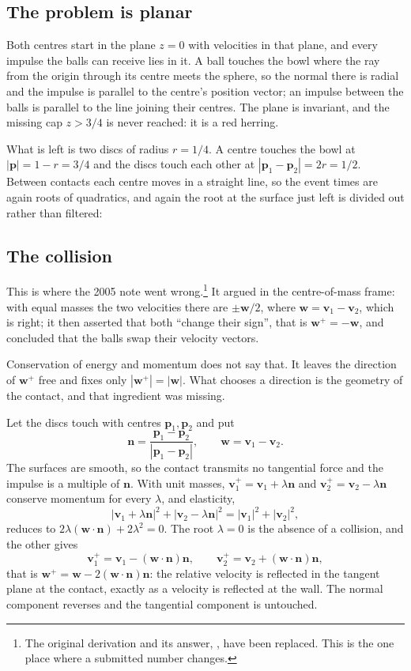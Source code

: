 \documentclass[11pt]{article}
\newcommand{\bp}{\mathbf{p}}
\newcommand{\bv}{\mathbf{v}}
\newcommand{\bw}{\mathbf{w}}
\newcommand{\bn}{\mathbf{n}}
\begin{document}
\subsection{The problem is planar}
Both centres start in the plane $z=0$ with velocities in that plane, and
every impulse the balls can receive lies in it. A ball touches the bowl
where the ray from the origin through its centre meets the sphere, so the
normal there is radial and the impulse is parallel to the centre's position
vector; an impulse between the balls is parallel to the line joining their
centres. The plane is invariant, and the missing cap $z > 3/4$ is never
reached: it is a red herring.

What is left is two discs of radius $r=1/4$. A centre touches the bowl at
$|\bp| = 1-r = 3/4$ and the discs touch each other at
$|\bp_1 - \bp_2| = 2r = 1/2$. Between contacts each centre moves in a
straight line, so the event times are again roots of quadratics, and again
the root at the surface just left is divided out rather than filtered:



\subsection{The collision}
This is where the 2005 note went wrong.\footnote{The original derivation and
its answer, \bowlold, have been replaced. This is the one place where a
submitted number changes.} It argued in the centre-of-mass frame: with equal
masses the two velocities there are $\pm\bw/2$, where $\bw = \bv_1-\bv_2$,
which is right; it then asserted that both ``change their sign'', that is
$\bw^+ = -\bw$, and concluded that the balls swap their velocity vectors.

Conservation of energy and momentum does not say that. It leaves the
direction of $\bw^+$ free and fixes only $|\bw^+| = |\bw|$. What chooses a
direction is the geometry of the contact, and that ingredient was missing.

Let the discs touch with centres $\bp_1,\bp_2$ and put
\[
   \bn = \frac{\bp_1-\bp_2}{|\bp_1-\bp_2|}, \qquad \bw = \bv_1-\bv_2 .
\]
The surfaces are smooth, so the contact transmits no tangential force and
the impulse is a multiple of $\bn$. With unit masses,
$\bv_1^+ = \bv_1 + \lambda\bn$ and $\bv_2^+ = \bv_2 - \lambda\bn$ conserve
momentum for every $\lambda$, and elasticity,
\[
   |\bv_1 + \lambda\bn|^2 + |\bv_2 - \lambda\bn|^2 = |\bv_1|^2 + |\bv_2|^2 ,
\]
reduces to $2\lambda(\bw\cdot\bn) + 2\lambda^2 = 0$. The root $\lambda = 0$
is the absence of a collision, and the other gives
\begin{equation}\label{eq:collide}
   \bv_1^+ = \bv_1 - (\bw\cdot\bn)\bn , \qquad
   \bv_2^+ = \bv_2 + (\bw\cdot\bn)\bn ,
\end{equation}
that is $\bw^+ = \bw - 2(\bw\cdot\bn)\bn$: the relative velocity is
reflected in the tangent plane at the contact, exactly as a velocity is
reflected at the wall. The normal component reverses and the tangential
component is untouched.
\end{document}
